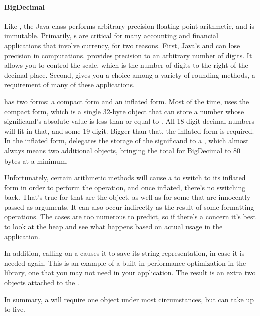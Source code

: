 \paragraph{BigDecimal} Like , the Java class
 performs arbitrary-precision
floating point arithmetic, and is immutable.
Primarily, s are critical for many accounting
and financial applications that involve currency, for two reasons. First, Java's
 and  can lose precision in computations.
 provides precision to an arbitrary number of digits. 
It allows you to control the scale, which is the number of digits to the right
of the decimal place. Second,  gives you a choice
among a variety of rounding
methods, a requirement of many of these applications.

 has two forms: a compact form and an
inflated form. Most of the time,  uses the compact form,
which is a single 32-byte object that can store a number whose significand's
absolute value is less than or equal to .
All 18-digit decimal numbers will fit in that, and some 19-digit.  Bigger than
that, the inflated form is required. In the inflated form, 
delegates the storage of the significand to a , which almost always means two additional
objects, bringing the total for BigDecimal to 80 bytes at a
minimum.  

Unfortunately, certain arithmetic methods will cause a
 to switch to its inflated form in order to perform the operation, and once
inflated, there's no switching back.  That's true for  that
are the  object, as well as for some that are innocently passed
as arguments. It can also occur indirectly as the result of some formatting
operations. The cases are too numerous to predict, so if there's a concern it's
best to look at the heap and see what happens based on actual usage in the application.

In addition, calling  on a  causes it to
save its string representation, in case it is needed again.
This is an example of a built-in performance optimization in the library, one 
that you may not need in your application. The result is an extra two objects
attached to the .

In summary, a  will require one
object under most circumstances, but can take up to five. 

